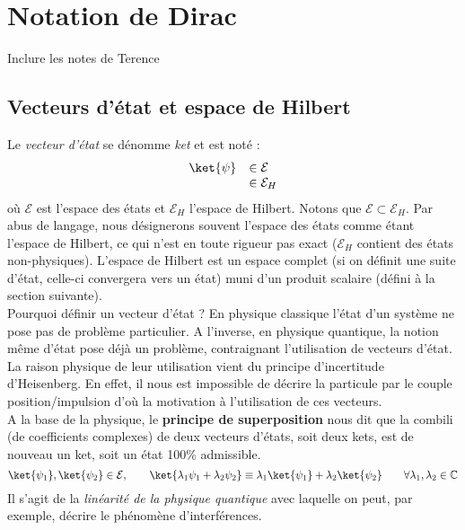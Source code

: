 \chapter{Notation de Dirac}
Inclure les notes de Terence
\section{Vecteurs d'état et espace de Hilbert}
Le \textit{vecteur d'état} se dénomme \textit{ket} et est noté :
\begin{equation}
\begin{array}{ll}
\ket{\psi} & \in \mathcal{E}\\
&\in \mathcal{E}_H
\end{array}
\end{equation}
où $\mathcal{E}$ est l'espace des états et $\mathcal{E}_H$ l'espace de Hilbert. 
Notons que $\mathcal{E} \subset \mathcal{E}_H$. Par abus de langage, nous 
désignerons souvent l'espace des états comme étant l'espace de Hilbert, ce qui 
n'est en toute rigueur pas exact ($\mathcal{E}_H$ contient des états non-physiques).
L'espace de Hilbert est un espace complet (si on définit une suite d'état, celle-ci 
convergera vers un état) muni d'un produit scalaire (défini à la section suivante).\\

Pourquoi définir un vecteur d'état ? En physique classique l'état d'un système 
ne pose pas de problème particulier. A l'inverse, en physique quantique, la notion 
même d'état pose déjà un problème, contraignant l'utilisation de vecteurs d'état. La raison 
physique de leur utilisation vient du principe d'incertitude d'Heisenberg. En effet, 
il nous est impossible de décrire la particule par le couple position/impulsion d'où 
la motivation à l'utilisation de ces vecteurs.\\

A la base de la physique, le \textbf{principe de superposition} nous dit que la 
combili (de coefficients complexes) de deux vecteurs d'états, soit deux kets, est 
de nouveau un ket, soit un état 100\% admissible.
\begin{equation}
\ket{\psi_1}, \ket{\psi_2} \in\mathcal{E},\qquad \ket{\lambda_1\psi_1+\lambda_2\psi_2} 
\equiv \lambda_1\ket{\psi_1}+\lambda_2\ket{\psi_2}\qquad \forall \lambda_1,\lambda_2\in
\mathbb{C}
\end{equation}
Il s'agit de la \textit{linéarité de la physique quantique} avec laquelle on peut, par 
exemple, décrire le phénomène d'interférences.


